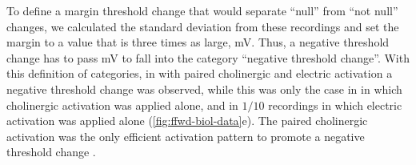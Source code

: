     To define a margin threshold change that would separate ``null'' from ``not null'' changes,
        we calculated the standard deviation from these recordings
        and set the margin to a value that is three times as large,
         mV.
    Thus, a negative threshold change has to pass  mV
        to fall into the category ``negative threshold change''.
    With this definition of categories,
        in 
            with paired cholinergic and electric activation
            a negative threshold change was observed,
        while this was only the case in
            in which cholinergic activation was applied alone,
        and in $1/10$ recordings in which electric activation was applied alone
        (\autoref{fig:ffwd-biol-data}e).
    The paired cholinergic activation was the only efficient activation pattern to promote a negative threshold change
        .


